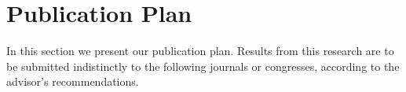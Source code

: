 \documentclass[11pt,authoryear]{elsarticle}
\begin{document}
% 
%	  	
\section{Publication Plan}\label{PubPlan}
  In this section we present our publication plan. Results from this research are to be submitted indistinctly 
  to the following journals or congresses, according to the advisor’s recommendations.
  
\end{document}
